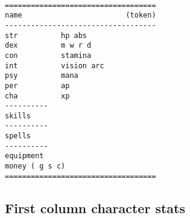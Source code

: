 \

\goodbreak
\begin{samepage} \begin{verbatim}
===================================
name                        (token)
-----------------------------------
str          hp abs
dex          m w r d
con          stamina
int          vision arc
psy          mana
per          ap
cha          xp
----------
skills
----------
spells
----------
equipment
money ( g s c)
===================================
\end{verbatim} \end{samepage}


\subsection*{First column character stats}

